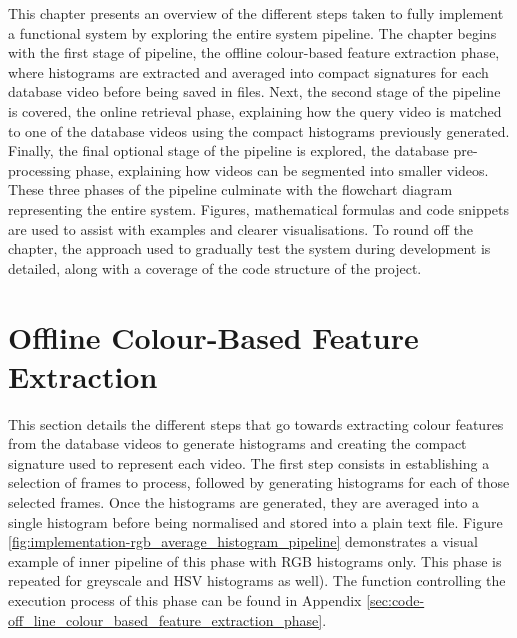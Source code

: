This chapter presents an overview of the different steps taken to fully implement a functional system by exploring the entire system pipeline. The chapter begins with the first stage of pipeline, the offline colour-based feature extraction phase, where histograms are extracted and averaged into compact signatures for each database video before being saved in files. Next, the second stage of the pipeline is covered, the online retrieval phase, explaining how the query video is matched to one of the database videos using the compact histograms previously generated. Finally, the final optional stage of the pipeline is explored, the database pre-processing phase, explaining how videos can be segmented into smaller videos. These three phases of the pipeline culminate with the flowchart diagram representing the entire system. Figures, mathematical formulas and code snippets are used to assist with examples and clearer visualisations. To round off the chapter, the approach used to gradually test the system during development is detailed, along with a coverage of the code structure of the project.


\section{Offline Colour-Based Feature Extraction}
\label{sec:implementation-offline-colour-based-feature-extraction}

This section details the different steps that go towards extracting colour features from the database videos to generate histograms and creating the compact signature used to represent each video. The first step consists in establishing a selection of frames to process, followed by generating histograms for each of those selected frames. Once the histograms are generated, they are averaged into a single histogram before being normalised and stored into a plain text file. Figure \ref{fig:implementation-rgb_average_histogram_pipeline} demonstrates a visual example of inner pipeline of this phase with RGB histograms only. This phase is repeated for greyscale and HSV histograms as well). The function controlling the execution process of this phase can be found in Appendix \ref{sec:code-off_line_colour_based_feature_extraction_phase}.\\

